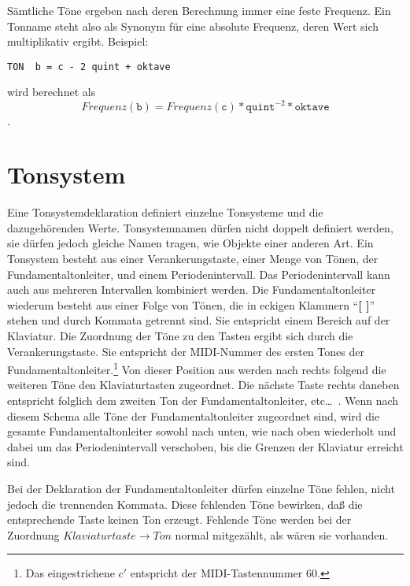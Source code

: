 Sämtliche Töne ergeben nach deren Berechnung immer eine feste Frequenz.
Ein Tonname steht also als Synonym für eine
absolute Frequenz, deren
Wert sich multiplikativ ergibt. Beispiel:
\begin{lstlisting} 
TON  b = c - 2 quint + oktave 
\end{lstlisting}
wird berechnet als \[Frequenz(\mathtt{b}) = Frequenz(\mathtt{c}) * \mathtt{quint}^{-2} * \mathtt{oktave}\].





\chapter{Tonsystem}\label{cha:tonsystem}
Eine Tonsystemdeklaration definiert einzelne Tonsysteme und die
dazugehörenden Werte. Tonsystemnamen dürfen nicht doppelt definiert
werden, sie dürfen jedoch gleiche Namen tragen,
wie Objekte einer anderen Art.
Ein Tonsystem besteht aus einer Verankerungstaste,
einer Menge von Tönen, der Fundamentaltonleiter, 
und einem Periodenintervall.
Das Periodenintervall kann auch aus mehreren Intervallen
kombiniert werden.
Die Fundamentaltonleiter wiederum
besteht aus einer Folge von Tönen, die in eckigen Klammern
``\textbf{[ ]}''
 stehen und durch Kommata getrennt sind.
Sie entspricht einem Bereich auf der Klaviatur. Die Zuordnung der Töne
zu den Tasten ergibt sich durch die Verankerungstaste.
Sie entspricht der MIDI-Nummer des ersten Tones der
Fundamentaltonleiter.\footnote{Das eingestrichene $c'$ entspricht
der MIDI-Tastennummer 60.}
Von dieser Position aus werden nach rechts folgend die weiteren Töne
den Klaviaturtasten zugeordnet. Die nächste Taste rechts daneben entspricht
folglich dem zweiten Ton der Fundamentaltonleiter, etc\ldots\ .
Wenn nach diesem Schema
alle Töne der Fundamentaltonleiter zugeordnet sind, wird die gesamte
Fundamentaltonleiter sowohl nach unten, wie nach oben wiederholt und
dabei um das Periodenintervall\label{Periodenintervall}
verschoben, bis die Grenzen der Klaviatur erreicht sind.

Bei der Deklaration der Fundamentaltonleiter
dürfen einzelne Töne fehlen, nicht jedoch die trennenden Kommata.
Diese fehlenden Töne bewirken,
daß die entsprechende Taste keinen Ton erzeugt.
Fehlende Töne werden bei der Zuordnung
$Klaviaturtaste \rightarrow Ton$ normal
mitgezählt, als wären sie vorhanden.



